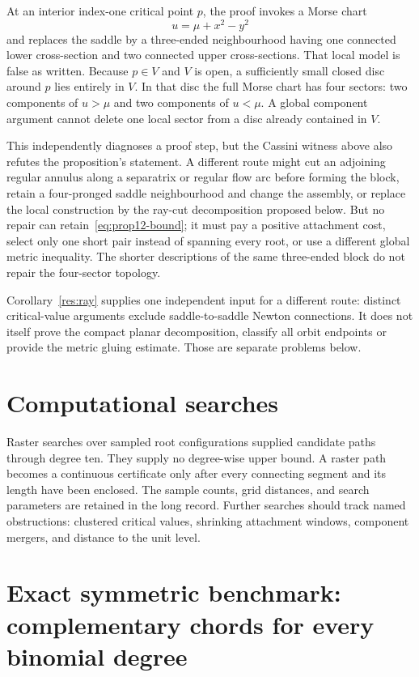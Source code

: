 \documentclass[11pt]{article}
\begin{document}
At an interior index-one critical point $p$, the proof invokes a Morse chart
\[
 u=\mu+x^2-y^2
\]
and replaces the saddle by a three-ended neighbourhood having one connected
lower cross-section and two connected upper cross-sections.  That local model
is false as written.  Because $p\in V$ and $V$ is open, a sufficiently small
closed disc around $p$ lies entirely in $V$.  In that disc the full Morse chart
has four sectors: two components of $u>\mu$ and two components of $u<\mu$.
A global component argument cannot delete one local sector from a disc already
contained in $V$.

This independently diagnoses a proof step, but the Cassini witness above also
refutes the proposition's statement.  A different route might
cut an adjoining regular annulus along a separatrix or regular flow arc before
forming the block, retain a four-pronged saddle neighbourhood and change the
assembly, or replace the local construction by the ray-cut decomposition
proposed below.  But no repair can retain~\eqref{eq:prop12-bound}; it must pay a
positive attachment cost, select only one short pair instead of spanning every
root, or use a different global metric inequality.
The shorter descriptions of the same three-ended block do not repair the
four-sector topology.

Corollary~\ref{res:ray} supplies one independent input for a different route:
distinct critical-value arguments exclude saddle-to-saddle Newton
connections.  It does not itself prove the compact planar decomposition,
classify all orbit endpoints or provide the metric gluing estimate.  Those are
separate problems below.

\section{Computational searches}\label{sec:finite}

Raster searches over sampled root configurations supplied candidate paths
through degree ten.  They supply no degree-wise upper bound.  A raster path
becomes a continuous certificate only after every connecting segment and its
length have been enclosed.  The sample counts, grid distances, and search
parameters are retained in the long record.  Further searches should track
named obstructions: clustered critical values, shrinking attachment windows,
component mergers, and distance to the unit level.

\section{Exact symmetric benchmark: complementary chords for every binomial degree}
\label{sec:binomial}
\end{document}
